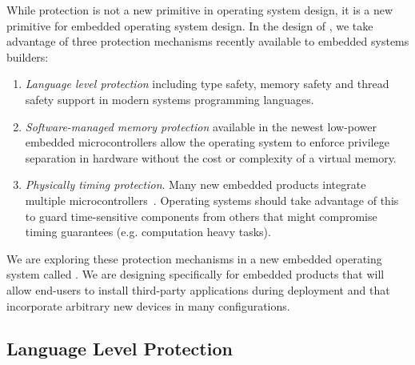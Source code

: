 
%

While protection is not a new primitive in operating system design, it is a
new primitive for embedded operating system design. In the design of \name, we
take advantage of three protection mechanisms recently available to embedded
systems builders:

\begin{enumerate}
  \item \emph{Language level protection} including type safety, memory safety
    and thread safety support in modern systems programming languages.
  \item \emph{Software-managed memory protection} available in the newest
    low-power embedded microcontrollers allow the operating system to enforce
    privilege separation in hardware without the cost or complexity of a virtual
    memory.
  \item \emph{Physically timing protection}. Many new embedded products
    integrate multiple microcontrollers~.
  Operating systems should take advantage of this to guard time-sensitive
  components from others that might compromise timing guarantees (e.g.
  computation heavy tasks).
\end{enumerate}

We are exploring these protection mechanisms in a new embedded operating system
called \name. We are designing \name specifically for embedded products that
will allow end-users to install third-party applications during deployment and
that incorporate arbitrary new devices in many configurations.

\subsection{Language Level Protection}

